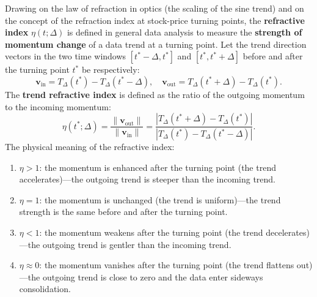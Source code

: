 \begin{definition}\label{def:refraction_index_data}
Drawing on the law of refraction in optics (the scaling of the sine trend) and on the concept of the refraction index at stock-price turning points, the \textbf{refractive index} $\eta(t; \Delta)$ is defined in general data analysis to measure the \textbf{strength of momentum change} of a data trend at a turning point. Let the trend direction vectors in the two time windows $[t^*-\Delta, t^*]$ and $[t^*, t^*+\Delta]$ before and after the turning point $t^*$ be respectively:
\[
\mathbf{v}_{\text{in}} = T_\Delta(t^*) - T_\Delta(t^*-\Delta), \quad \mathbf{v}_{\text{out}} = T_\Delta(t^*+\Delta) - T_\Delta(t^*).
\]
The \textbf{trend refractive index} is defined as the ratio of the outgoing momentum to the incoming momentum:
\[
\eta(t^*; \Delta) = \frac{\|\mathbf{v}_{\text{out}}\|}{\|\mathbf{v}_{\text{in}}\|} = \frac{|T_\Delta(t^*+\Delta) - T_\Delta(t^*)|}{|T_\Delta(t^*) - T_\Delta(t^*-\Delta)|}.
\]
The physical meaning of the refractive index:
\begin{enumerate}[label=(\roman*)]
    \item $\eta > 1$: the momentum is enhanced after the turning point (the trend accelerates)---the outgoing trend is steeper than the incoming trend.
    \item $\eta = 1$: the momentum is unchanged (the trend is uniform)---the trend strength is the same before and after the turning point.
    \item $\eta < 1$: the momentum weakens after the turning point (the trend decelerates)---the outgoing trend is gentler than the incoming trend.
    \item $\eta \approx 0$: the momentum vanishes after the turning point (the trend flattens out)---the outgoing trend is close to zero and the data enter sideways consolidation.
\end{enumerate}
\end{definition}

